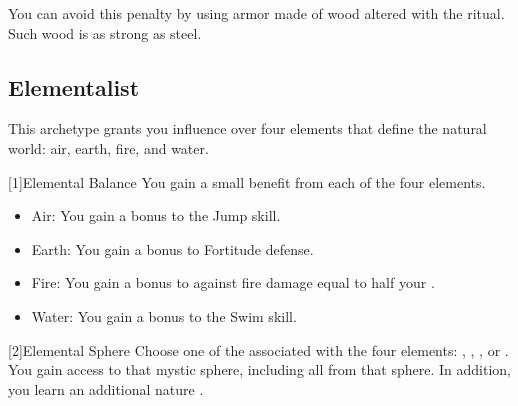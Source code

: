         You can avoid this penalty by using armor made of wood altered with the  ritual.
        Such wood is as strong as steel.

    \subsection{Elementalist}\label{Elementalist}
        This archetype grants you influence over four elements that define the natural world: air, earth, fire, and water.

        [1]{Elemental Balance} You gain a small benefit from each of the four elements.
        \begin{itemize}
            \item Air: You gain a  bonus to the Jump skill.
            \item Earth: You gain a  bonus to Fortitude defense.
            \item Fire: You gain a bonus to  against fire damage equal to half your .
            \item Water: You gain a  bonus to the Swim skill.
        \end{itemize}

        [2]{Elemental Sphere} Choose one of the  associated with the four elements: , , , or .
        You gain access to that mystic sphere, including all  from that sphere.
        In addition, you learn an additional nature .

